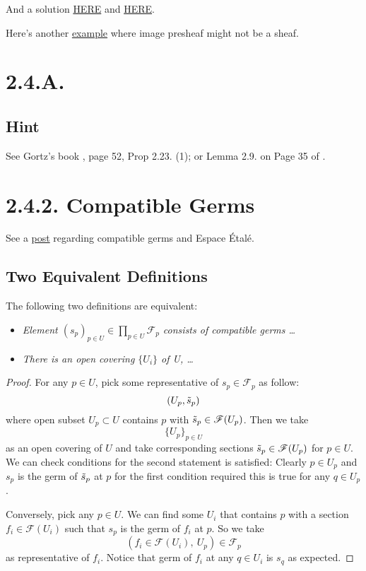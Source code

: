 And a solution \href{https://math.mit.edu/~mckernan/Teaching/09-10/Autumn/18.725/model5.pdf}{HERE} and \href{https://metaphor.ethz.ch/x/2017/fs/401-3146-12L/ex/SolSheet5.pdf}{HERE}.

Here's another \href{https://www.kth.se/polopoly_fs/1.291614.1550158503!/Menu/general/column-content/attachment/Lecture1AlgGeo.pdf}{example} where image presheaf might not be a sheaf.


\section{2.4.A.}

\subsection{Hint}
See G\;ortz's book \cite{gortz2020algebraic}, page 52, Prop 2.23. (1); or Lemma 2.9. on Page 35 of \cite{qing2006algebraic}. 


\section{2.4.2. Compatible Germs}\label{2.4.2.}

See a \href{https://math.stackexchange.com/questions/2042363/compatible-germs-and-the-espace-étalé}{post} regarding compatible germs and Espace \'Etal\'e.

\subsection{Two Equivalent Definitions}
The following two definitions are equivalent:
\begin{itemize}
	\item \textit{Element $(s_p)_{p\in U}\in \prod_{p\in U}\mathscr F_p$ consists of compatible germs \dots }
	\item \textit{There is an open covering $\{U_i\}$ of U, \dots}
\end{itemize}
\begin{proof}
	For any $p\in U$, pick some representative of $s_p\in\mathscr F_p$ as follow: \[(U_p,\Tilde{s}_p)\]where open subset $U_p\subset U$ contains $p$ with $\Tilde s_p\in\mathscr F(U_p)$. Then we take \[\{U_p\}_{p\in U}\] as an open covering of $U$ and take corresponding sections $\Tilde s_p\in\mathscr F(U_p)$ for $p\in U$. We can check conditions for the second statement is satisfied: Clearly $p\in U_p$ and $s_p$ is the germ of $\Tilde s_p$ at $p$ for the first condition required this is true for any $q\in U_p$.

	Conversely, pick any $p\in U$. We can find some $U_i$ that contains $p$ with a section $f_i\in\mathscr F(U_i)$ such that $s_p$ is the germ of $f_i$ at $p$. So we take 
	\[(f_i\in\mathscr F(U_i),~U_p)\in\mathscr F_p\] as representative of $f_i$. Notice that germ of $f_i$ at any $q\in U_i$ is $s_q$ as expected. 
\end{proof}

